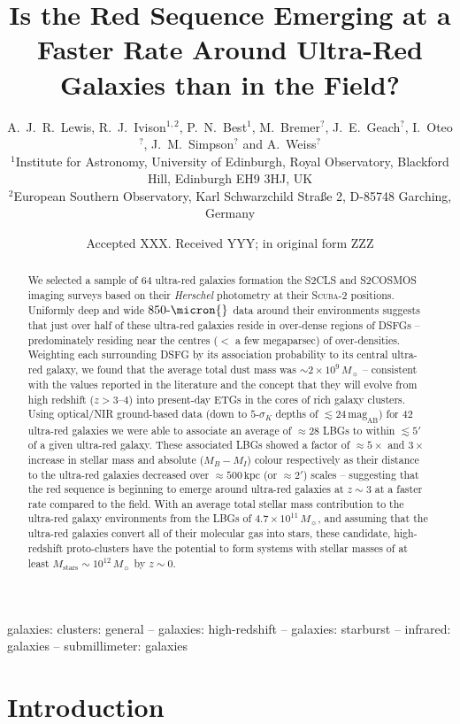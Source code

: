 \documentclass[a4paper, fleqn, usenatbib]{mnras}
\title[Is the Red Sequence Emerging at a Faster Rate Around Ultra-Red Galaxies?]{Is the Red Sequence Emerging at a Faster Rate Around Ultra-Red Galaxies than in the Field?}
\author[A.~J.~R.~Lewis et al.]{%
A.~J.~R.~Lewis,
R.~J.~Ivison$^{1,2}$,
P.~N.~Best$^{1}$,
M.~Bremer$^{?}$,
J.~E.~Geach$^{?}$,
\newauthor
I.~Oteo$^{?}$,
J.~M.~Simpson$^{?}$ and
A.~Weiss$^{?}$\\
$^{1}$Institute for Astronomy, University of Edinburgh, Royal Observatory, Blackford Hill, Edinburgh EH9 3HJ, UK\\
$^{2}$European Southern Observatory, Karl Schwarzchild Stra{\ss}e 2, D-85748 Garching, Germany
}
\date{Accepted XXX. Received YYY; in original form ZZZ}
\newcommand{\herschel}{\textit{Herschel}}
\newcommand{\magab}{\text{mag}_{\text{AB}}}
\newcommand{\msol}{M_{\sun}}
\newcommand{\mstars}{M_{\text{stars}}}
\newcommand{\scuba}{\mbox{\textsc{Scuba}-2}}
\newcommand{\urg}{ultra-red galaxy}
\begin{document}
\label{firstpage}
\pagerange{\pageref{firstpage}--\pageref{lastpage}}
\maketitle

\begin{abstract}
We selected a sample of $64$ ultra-red galaxies formation the S2CLS and S2COSMOS imaging surveys based on their \herschel{} photometry at their \scuba{} positions.
Uniformly deep and wide $850\text{-}\micron{}$ data around their environments suggests that just over half of these ultra-red galaxies reside in over-dense regions of DSFGs -- predominately residing near the centres ($<$ a few megaparsec) of over-densities.
Weighting each surrounding DSFG by its association probability to its central ultra-red galaxy, we found that the average total dust mass was $\sim2\times10^{9}\,\msol{}$ -- consistent with the values reported in the literature and the concept that they will evolve from high redshift ($z>3\text{--}4$) into present-day ETGs in the cores of rich galaxy clusters.
%
Using optical/NIR ground-based data (down to $5\text{-}\sigma_{K}$ depths of $\lesssim24\,\magab{}$) for $42$ ultra-red galaxies we were able to associate an average of $\approx28$ LBGs to within $\lesssim5'$ of a given \urg{}.
These associated LBGs showed a factor of $\approx5\times$ and $3\times$ increase in stellar mass and absolute ($M_{B}-M_{I}$) colour respectively as their distance to the ultra-red galaxies decreased over $\approx500\,\text{kpc}$ (or $\approx2'$) scales -- suggesting that the red sequence is beginning to emerge around ultra-red galaxies at $z\sim3$ at a faster rate compared to the field.
%
With an average total stellar mass contribution to the ultra-red galaxy environments from the LBGs of $4.7\times10^{11}\,\msol{}$, and assuming that the ultra-red galaxies convert all of their molecular gas into stars, these candidate, high-redshift proto-clusters have the potential to form systems with stellar masses of at least $\mstars{}\sim10^{12}\,\msol{}$ by $z\sim0$.
\end{abstract}

\begin{keywords}
galaxies: clusters: general -- galaxies: high-redshift -- galaxies: starburst -- infrared: galaxies -- submillimeter: galaxies
\end{keywords}

\section{Introduction}
\end{document}
